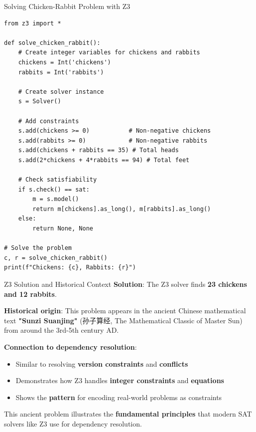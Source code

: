 \documentclass{beamer}
\begin{document}
\begin{frame}[fragile,t]{Solving Chicken-Rabbit Problem with Z3}
\begin{verbatim}
from z3 import *

def solve_chicken_rabbit():
    # Create integer variables for chickens and rabbits
    chickens = Int('chickens')
    rabbits = Int('rabbits')
    
    # Create solver instance
    s = Solver()
    
    # Add constraints
    s.add(chickens >= 0)           # Non-negative chickens
    s.add(rabbits >= 0)            # Non-negative rabbits
    s.add(chickens + rabbits == 35) # Total heads
    s.add(2*chickens + 4*rabbits == 94) # Total feet
    
    # Check satisfiability
    if s.check() == sat:
        m = s.model()
        return m[chickens].as_long(), m[rabbits].as_long()
    else:
        return None, None

# Solve the problem
c, r = solve_chicken_rabbit()
print(f"Chickens: {c}, Rabbits: {r}")
\end{verbatim}
\end{frame}

\begin{frame}[t]{Z3 Solution and Historical Context}
\textbf{Solution}: The Z3 solver finds \textbf{23 chickens and 12 rabbits}.

\bigskip

\textbf{Historical origin}: This problem appears in the ancient Chinese mathematical text \textbf{"Sunzi Suanjing"} (孙⼦算经, The Mathematical Classic of Master Sun) from around the 3rd-5th century AD.

\bigskip

\textbf{Connection to dependency resolution}:
\begin{itemize}
\item Similar to resolving \textbf{version constraints} and \textbf{conflicts}
\item Demonstrates how Z3 handles \textbf{integer constraints} and \textbf{equations}
\item Shows the \textbf{pattern} for encoding real-world problems as constraints
\end{itemize}

This ancient problem illustrates the \textbf{fundamental principles} that modern SAT solvers like Z3 use for dependency resolution.
\end{frame}
\end{document}
